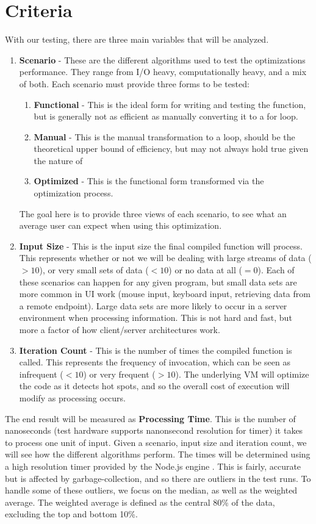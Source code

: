 \section{Criteria}

With our testing, there are three main variables that will be analyzed.

\begin{enumerate}
  \item \textbf{Scenario} - These are the different algorithms used to test the optimizations performance. They range from I/O heavy, computationally heavy, and a mix of both.  Each scenario must provide three forms to be tested:
    \begin{enumerate}
      \item \textbf{Functional} - This is the ideal form for writing and testing the function, but is generally not as efficient as manually converting it to a for loop.
      \item \textbf{Manual} - This is the manual transformation to a  loop, should be the theoretical upper bound of efficiency, but may not always hold true given the nature of \javascript
      \item \textbf{Optimized} - This is the functional form transformed via the optimization process.  
    \end{enumerate}
  The goal here is to provide three views of each scenario, to see what an average user can expect when using this optimization.
  \item \textbf{Input Size} - This is the input size the final compiled function will process.  This represents whether or not we will be dealing with large streams of data ($> 10$), or very small sets of data ($< 10$) or no data at all ($=0$).  Each of these scenarios can happen for any given program, but small data sets are more common in UI work (mouse input, keyboard input, retrieving data from a remote endpoint).  Large data sets are more likely to occur in a server environment when processing information. This is not hard and fast, but more a factor of how client/server architectures work. 
  \item \textbf{Iteration Count} - This is the number of times the compiled function is called.  This represents the frequency of invocation, which can be seen as infrequent ($< 10$) or very frequent ($> 10$).  The underlying VM will optimize the code as it detects hot spots, and so the overall cost of execution will modify as processing occurs.  
\end{enumerate}

The end result will be measured as \textbf{Processing Time}. This is the number of nanoseconds (test hardware supports nanonsecond resolution for timer) it takes to process one unit of input.  Given a scenario, input size and iteration count, we will see how the different algorithms perform.  The times will be determined using a high resolution timer provided by the Node.js engine \cite{nodehr16}.  This is fairly, accurate but is affected by garbage-collection, and so there are outliers in the test runs. To handle some of these outliers, we focus on the median, as well as the weighted average. The weighted average is defined as the central 80\% of the data, excluding the top and bottom 10\%.
